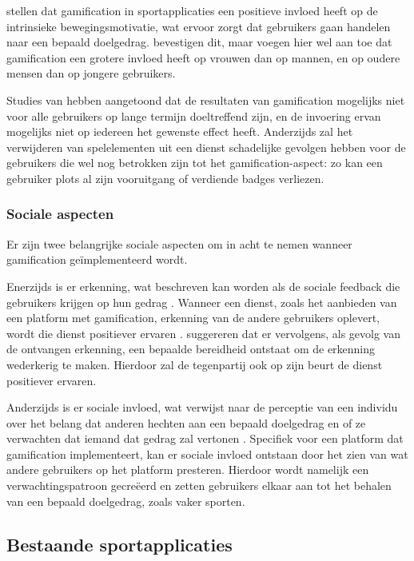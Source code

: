 \textcite{Kari2016} stellen dat gamification in sportapplicaties een positieve invloed heeft op de intrinsieke bewegingsmotivatie, wat ervoor zorgt dat gebruikers gaan handelen naar een bepaald doelgedrag. \textcite{PoloPena2020} bevestigen dit, maar voegen hier wel aan toe dat gamification een grotere invloed heeft op vrouwen dan op mannen, en op oudere mensen dan op jongere gebruikers.

Studies van \textcite{Hamari2013a} hebben aangetoond dat de resultaten van gamification mogelijks niet voor alle gebruikers op lange termijn doeltreffend zijn, en de invoering ervan mogelijks niet op iedereen het gewenste effect heeft.
Anderzijds zal het verwijderen van spelelementen uit een dienst schadelijke gevolgen hebben voor de gebruikers die wel nog betrokken zijn tot het gamification-aspect: zo kan een gebruiker plots al zijn vooruitgang of verdiende badges verliezen.

\subsubsection{Sociale aspecten}

Er zijn twee belangrijke sociale aspecten om in acht te nemen wanneer gamification geïmplementeerd wordt.

Enerzijds is er erkenning, wat beschreven kan worden als de sociale feedback die gebruikers krijgen op hun gedrag \autocite{Cheung2011}.
Wanneer een dienst, zoals het aanbieden van een platform met gamification, erkenning van de andere gebruikers oplevert, wordt die dienst positiever ervaren \autocite{Preece2001}.
\textcite{Hamari2013} suggereren dat er vervolgens, als gevolg van de ontvangen erkenning, een bepaalde bereidheid ontstaat om de erkenning wederkerig te maken. Hierdoor zal de tegenpartij ook op zijn beurt de dienst positiever ervaren.

Anderzijds is er sociale invloed, wat verwijst naar de perceptie van een individu over het belang dat anderen hechten aan een bepaald doelgedrag en of ze verwachten dat iemand dat gedrag zal vertonen \autocite{Ajzen1991}. Specifiek voor een platform dat gamification implementeert, kan er sociale invloed ontstaan door het zien van wat andere gebruikers op het platform presteren. Hierdoor wordt namelijk een verwachtingspatroon gecreëerd en zetten gebruikers elkaar aan tot het behalen van een bepaald doelgedrag, zoals vaker sporten.

\subsection{Bestaande sportapplicaties}

